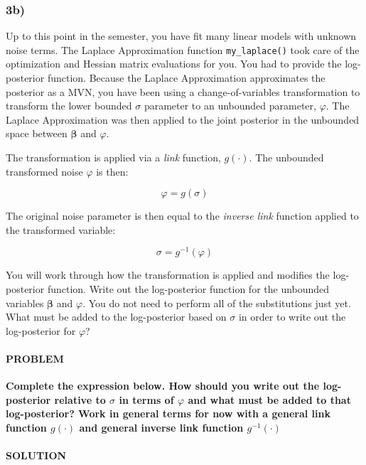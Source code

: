 \documentclass[
]{article}
\begin{document}
\hypertarget{b-2}{%
\subsubsection{3b)}\label{b-2}}

Up to this point in the semester, you have fit many linear models with
unknown noise terms. The Laplace Approximation function
\texttt{my\_laplace()} took care of the optimization and Hessian matrix
evaluations for you. You had to provide the log-posterior function.
Because the Laplace Approximation approximates the posterior as a MVN,
you have been using a change-of-variables transformation to transform
the lower bounded \(\sigma\) parameter to an unbounded parameter,
\(\varphi\). The Laplace Approximation was then applied to the joint
posterior in the unbounded space between \(\boldsymbol{\beta}\) and
\(\varphi\).

The transformation is applied via a \emph{link} function,
\(g\left(\cdot\right)\). The unbounded transformed noise \(\varphi\) is
then:

\[ 
\varphi = g\left(\sigma\right)
\]

The original noise parameter is then equal to the \emph{inverse link}
function applied to the transformed variable:

\[ 
\sigma = g^{-1} \left(\varphi\right)
\]

You will work through how the transformation is applied and modifies the
log-posterior function. Write out the log-posterior function for the
unbounded variables \(\boldsymbol{\beta}\) and \(\varphi\). You do not
need to perform all of the substitutions just yet. What must be added to
the log-posterior based on \(\sigma\) in order to write out the
log-posterior for \(\varphi\)?

\hypertarget{problem-13}{%
\paragraph{PROBLEM}\label{problem-13}}

\textbf{Complete the expression below. How should you write out the
log-posterior relative to \(\sigma\) in terms of \(\varphi\) and what
must be added to that log-posterior? Work in general terms for now with
a general link function \(g\left(\cdot\right)\) and general inverse link
function \(g^{-1}\left(\cdot\right)\)}

\hypertarget{solution-13}{%
\paragraph{SOLUTION}\label{solution-13}}
\end{document}
